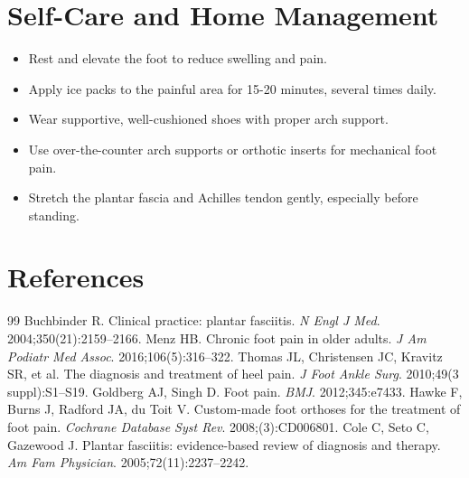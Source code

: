 \section*{Self-Care and Home Management}
\begin{itemize}
  \item Rest and elevate the foot to reduce swelling and pain.
  \item Apply ice packs to the painful area for 15-20 minutes, several times daily.
  \item Wear supportive, well-cushioned shoes with proper arch support.
  \item Use over-the-counter arch supports or orthotic inserts for mechanical foot pain.
  \item Stretch the plantar fascia and Achilles tendon gently, especially before standing.
\end{itemize}

\section*{References}
\begin{thebibliography}{99}
Buchbinder R. Clinical practice: plantar fasciitis. \textit{N Engl J Med}. 2004;350(21):2159--2166.
Menz HB. Chronic foot pain in older adults. \textit{J Am Podiatr Med Assoc}. 2016;106(5):316--322.
Thomas JL, Christensen JC, Kravitz SR, et al. The diagnosis and treatment of heel pain. \textit{J Foot Ankle Surg}. 2010;49(3 suppl):S1--S19.
Goldberg AJ, Singh D. Foot pain. \textit{BMJ}. 2012;345:e7433.
Hawke F, Burns J, Radford JA, du Toit V. Custom-made foot orthoses for the treatment of foot pain. \textit{Cochrane Database Syst Rev}. 2008;(3):CD006801.
Cole C, Seto C, Gazewood J. Plantar fasciitis: evidence-based review of diagnosis and therapy. \textit{Am Fam Physician}. 2005;72(11):2237--2242.
\end{thebibliography}
